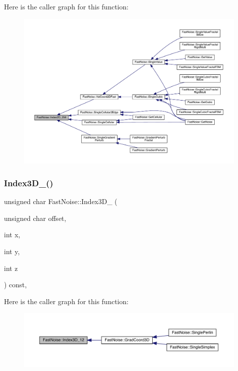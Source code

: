Here is the caller graph for this function\+:
\nopagebreak
\begin{figure}[H]
\begin{center}
\leavevmode
\includegraphics[width=350pt]{class_fast_noise_aec59eb9f9bcdb06e6a7dbe5a3fdf7145_icgraph}
\end{center}
\end{figure}
\mbox{\label{class_fast_noise_ab4304e7e7b79684b371492d3c7f0aa51}} 
\subsubsection{\texorpdfstring{Index3\+D\+\_()}{Index3D\_12()}}
{\footnotesize\ttfamily unsigned char Fast\+Noise\+::\+Index3\+D\+\_ (\begin{DoxyParamCaption}\item[{unsigned char}]{offset,  }\item[{int}]{x,  }\item[{int}]{y,  }\item[{int}]{z }\end{DoxyParamCaption}) const\hspace{0.3cm}{\ttfamily [inline]}, {\ttfamily [private]}}

Here is the caller graph for this function\+:
\nopagebreak
\begin{figure}[H]
\begin{center}
\leavevmode
\includegraphics[width=350pt]{class_fast_noise_ab4304e7e7b79684b371492d3c7f0aa51_icgraph}
\end{center}
\end{figure}
\mbox{\label{class_fast_noise_a1102de0e643266c5ea9b54a5bbca2476}} 
